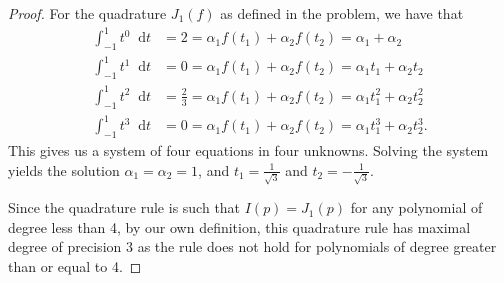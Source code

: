 \documentclass[12pt]{article}
\theoremstyle{definition}
\newcommand*\diff{\mathop{}\!\mathrm{d}}
\begin{document}
\begin{proof}
  For the quadrature $J_1(f)$ as defined in the problem, we have that
  \begin{align*}
    \int_{-1}^{1} t^0 \diff{t} &= 2 = \alpha_1 f(t_1) + \alpha_2 f(t_2) = \alpha_1 + \alpha_2 \\
    \int_{-1}^{1} t^1 \diff{t} &= 0 = \alpha_1 f(t_1) + \alpha_2 f(t_2) = \alpha_1 t_1 + \alpha_2 t_2 \\
    \int_{-1}^{1} t^2 \diff{t} &= \frac{2}{3} = \alpha_1 f(t_1) + \alpha_2 f(t_2) = \alpha_1 t_1^2 + \alpha_2 t_2^2 \\
    \int_{-1}^{1} t^3 \diff{t} &= 0 = \alpha_1 f(t_1) + \alpha_2 f(t_2) = \alpha_1 t_1^3 + \alpha_2 t_2^3.
  \end{align*}
  This gives us a system of four equations in four unknowns. Solving the system
  yields the solution $\alpha_1 = \alpha_2 = 1$, and $t_1 = \frac{1}{\sqrt{3}}$ and
  $t_2 = -\frac{1}{\sqrt{3}}$.

  Since the quadrature rule is such that $I(p) = J_1(p)$ for any polynomial
  of degree less than 4, by our own definition, this quadrature rule has
  maximal degree of precision 3 as the rule does not hold for polynomials of
  degree greater than or equal to 4.
\end{proof}
\end{document}
